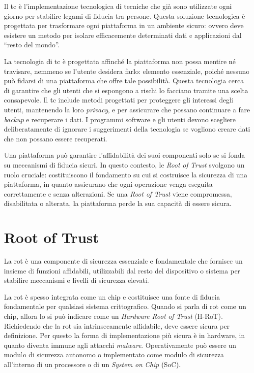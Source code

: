 Il \acrshort{tc} è l'implementazione tecnologica di tecniche che già sono utilizzate ogni giorno per stabilire legami di fiducia tra persone. Questa soluzione tecnologica è progettata per trasformare ogni piattaforma in un ambiente sicuro: ovvero deve esistere un metodo per isolare efficacemente determinati dati e applicazioni dal \enquote{resto del mondo}. 

La tecnologia di \acrshort{tc} è progettata affinché la piattaforma non possa mentire né travisare, nemmeno se l'utente desidera farlo: elemento essenziale, poiché nessuno può fidarsi di una piattaforma che offre tale possibilità. Questa tecnologia cerca di garantire che gli utenti che si espongono a rischi lo facciano tramite una scelta consapevole. Il \acrshort{tc} include metodi progettati per proteggere gli interessi degli utenti, mantenendo la loro \textit{privacy}, e per assicurare che possano continuare a fare \textit{backup} e recuperare i dati. I programmi software e gli utenti devono scegliere deliberatamente di ignorare i suggerimenti della tecnologia se vogliono creare dati che non possano essere recuperati.

Una piattaforma può garantire l'affidabilità dei suoi componenti solo se si fonda su meccanismi di fiducia sicuri. In questo contesto, le \textit{Root of Trust} svolgono un ruolo cruciale: costituiscono il fondamento su cui si costruisce la sicurezza di una piattaforma, in quanto assicurano che ogni operazione venga eseguita correttamente e senza alterazioni. Se una \textit{Root of Trust} viene compromessa, disabilitata o alterata, la piattaforma perde la sua capacità di essere sicura.


\section{Root of Trust}\label{sec:root_of_trust}
La \acrfull{rot} è una componente di sicurezza essenziale e fondamentale che fornisce un insieme di funzioni affidabili, utilizzabili dal resto del dispositivo o sistema per stabilire meccanismi e livelli di sicurezza elevati. 

La \acrshort{rot} è spesso integrata come un chip e costituisce una fonte di fiducia fondamentale per qualsiasi sistema crittografico. Quando si parla di \acrshort{rot} come un chip, allora lo si può indicare come un \textit{Hardware Root of Trust} (H-RoT). Richiedendo che la \acrshort{rot} sia intrinsecamente affidabile, deve essere sicura per definizione. Per questo la forma di implementazione più sicura è in hardware, in quanto diventa immune agli attacchi \textit{malware}. Operativamente può essere un modulo di sicurezza autonomo o implementato come modulo di sicurezza all'interno di un processore o di un \textit{System on Chip} (SoC).

